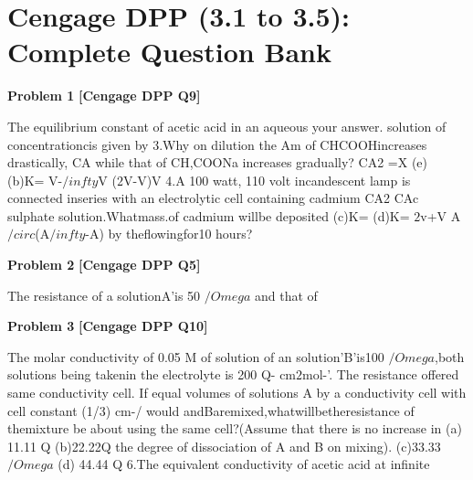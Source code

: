 \chapter{Cengage DPP (3.1 to 3.5): Complete Question Bank}
\label{chap:cng_dpp_all_questions}

\begin{problembox}
\textbf{Problem 1} \hfill \textbf{[Cengage DPP Q9]}
\label{q:ext-cng_dpp_all_questions-1}

The equilibrium constant of acetic acid in an aqueous
your answer.
solution of concentrationcis given by
3.Why on dilution the Am of CHCOOHincreases drastically,
CA
while that of CH,COONa increases gradually?
CA2
=X (e)
(b)K=
V-$/infty$V
($2$V-V)V
4.A 100 watt, 110 volt incandescent lamp is connected
inseries with an electrolytic cell containing cadmium
CA2
CAc
sulphate solution.Whatmass.of cadmium willbe deposited
(c)K=
(d)K=
$2$v+V
A$/circ$(A$/infty$-A)
by theflowingfor10 hours?
\end{problembox}

\begin{problembox}
\textbf{Problem 2} \hfill \textbf{[Cengage DPP Q5]}
\label{q:ext-cng_dpp_all_questions-2}

The resistance of a solutionA'is 50 $/Omega$ and that of
\end{problembox}

\begin{problembox}
\textbf{Problem 3} \hfill \textbf{[Cengage DPP Q10]}
\label{q:ext-cng_dpp_all_questions-3}

The molar conductivity of 0.05 M of solution of an
solution'B'is100 $/Omega$,both solutions being takenin the
electrolyte is 200 Q- cm$2$mol-'. The resistance offered
same conductivity cell. If equal volumes of solutions A
by a conductivity cell with cell constant (1/3) cm-/ would
andBaremixed,whatwillbetheresistance of themixture
be about
using the same cell?(Assume that there is no increase in
(a) 11.11 Q
(b)22.22Q
the degree of dissociation of A and B on mixing).
(c)33.33$/Omega$
(d) 44.44 Q
6.The equivalent conductivity of acetic acid at infinite
\end{problembox}

